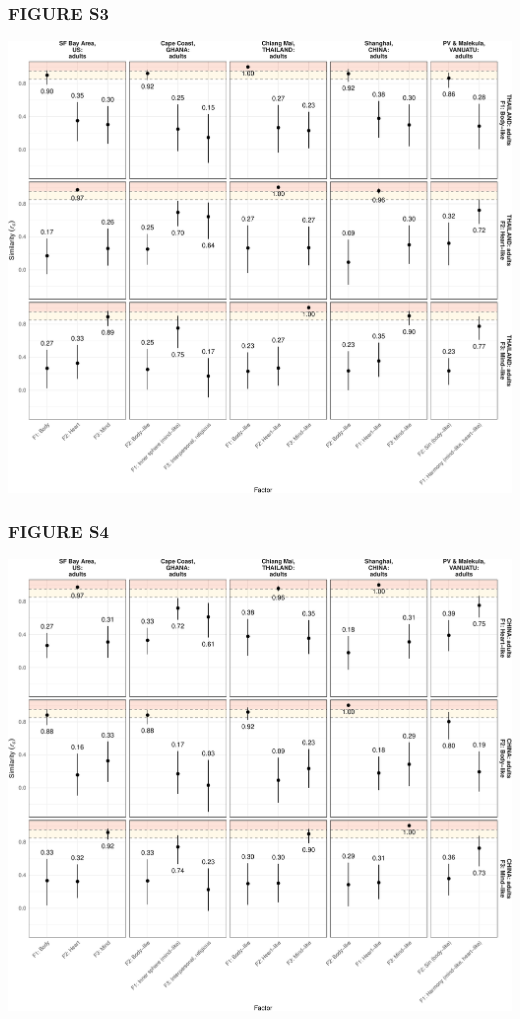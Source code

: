 \documentclass[
  man]{apa6}
\begin{document}
\hypertarget{figure-s3}{%
\subsubsection{FIGURE S3}\label{figure-s3}}

\includegraphics{Script_Re_Weisman_2021_Group1_2024_files/figure-latex/cong cis th base adults-1.pdf}

\hypertarget{figure-s4}{%
\subsubsection{FIGURE S4}\label{figure-s4}}

\includegraphics{Script_Re_Weisman_2021_Group1_2024_files/figure-latex/cong cis ch base adults-1.pdf}
\end{document}
